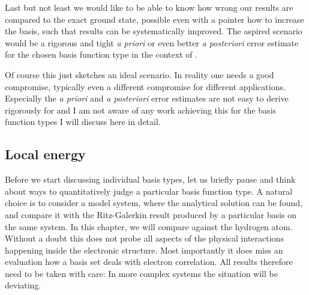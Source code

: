 Last but not least we would like to be able to know
how wrong our \HF results are compared to the exact \HF ground state,
possible even with a pointer how to increase the basis,
such that results can be systematically improved.
The aspired scenario would be a rigorous and tight
\textit{a priori} or even better \textit{a posteriori} error estimate
for the chosen basis function type in the context of \HF.

Of course this just sketches an ideal scenario.
In reality one needs a good compromise,
typically even a different compromise for different applications.
Especially the \textit{a priori} and \textit{a posteriori} error estimates
are not easy to derive rigorously for \HF
and I am not aware of any work achieving this for the basis function
types I will discuss here in detail.

\subsection{Local energy}
\label{sec:LocalEnergy}
Before we start discussing individual basis types,
let us briefly pause and think about ways to quantitatively
judge a particular basis function type.
A natural choice is to consider a model system,
where the analytical solution can be found, and compare it
with the Ritz-Galerkin \HF result produced by a particular basis on the same system.
In this chapter, we will compare against the hydrogen atom.
Without a doubt this does not probe all aspects of the physical interactions
happening inside the electronic structure.
Most importantly it does miss an evaluation
how a basis set deals with electron correlation.
All results therefore need to be taken with care:
In more complex systems the situation will be deviating.

